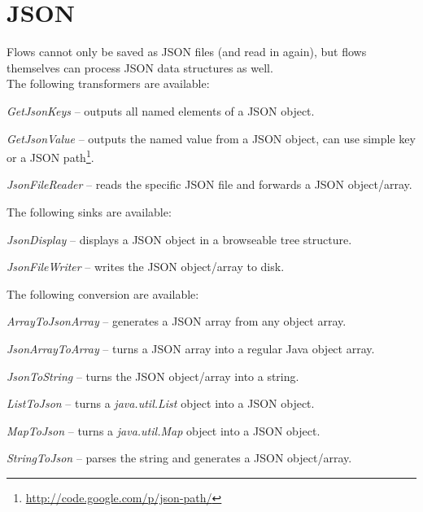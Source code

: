 \section{JSON}
\label{json}
Flows cannot only be saved as JSON\cite{json} files (and read in again), but flows
themselves can process JSON data structures as well. \\
The following transformers are available:
\begin{tight_itemize}
	\item \textit{GetJsonKeys} -- outputs all named elements
	of a JSON object.
	\item \textit{GetJsonValue} -- outputs the named value 
	from a JSON object, can use simple key or a JSON 
	path\footnote{\url{http://code.google.com/p/json-path/}{}}.
	\item \textit{JsonFileReader} -- reads the specific JSON file and forwards
	a JSON object/array.
\end{tight_itemize}
The following sinks are available:
\begin{tight_itemize}
	\item \textit{JsonDisplay} -- displays a JSON object in a browseable 
	tree structure.
	\item \textit{JsonFileWriter} -- writes the JSON object/array to disk.
\end{tight_itemize}
The following conversion are available:
\begin{tight_itemize}
	\item \textit{ArrayToJsonArray} -- generates a JSON array from any object
	array.
	\item \textit{JsonArrayToArray} -- turns a JSON array into a regular Java 
	object array.
	\item \textit{JsonToString} -- turns the JSON object/array into a string.
	\item \textit{ListToJson} -- turns a \textit{java.util.List} object
	into a JSON object.
	\item \textit{MapToJson} -- turns a \textit{java.util.Map} object
	into a JSON object.
	\item \textit{StringToJson} -- parses the string and generates a JSON
	object/array.
\end{tight_itemize}

\newpage
